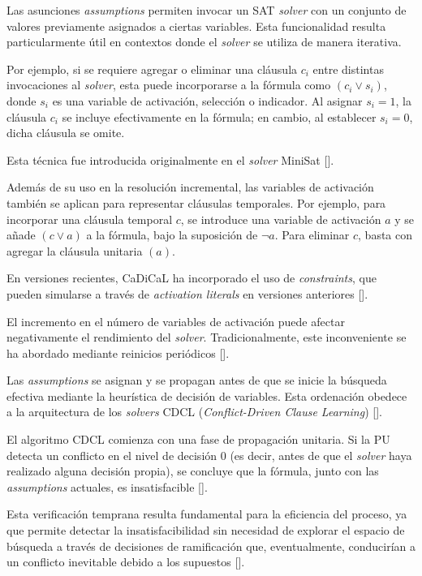 Las asunciones \textit{assumptions} permiten invocar un SAT \textit{solver} con un conjunto de valores previamente asignados a ciertas variables. Esta funcionalidad resulta particularmente útil en contextos donde el \textit{solver} se utiliza de manera iterativa.

Por ejemplo, si se requiere agregar o eliminar una cláusula $c_i$ entre distintas invocaciones al \textit{solver}, esta puede incorporarse a la fórmula como $(c_i \lor s_i)$, donde $s_i$ es una variable de activación, selección o indicador. Al asignar $s_i = 1$, la cláusula $c_i$ se incluye efectivamente en la fórmula; en cambio, al establecer $s_i = 0$, dicha cláusula se omite.

Esta técnica fue introducida originalmente en el \textit{solver} MiniSat [\cite{marques-silva2024cdcl}].

Además de su uso en la resolución incremental, las variables de activación también se aplican para representar cláusulas temporales. Por ejemplo, para incorporar una cláusula temporal $c$, se introduce una variable de activación $a$ y se añade $(c \lor a)$ a la fórmula, bajo la suposición de $\neg a$. Para eliminar $c$, basta con agregar la cláusula unitaria $(a)$.

En versiones recientes, CaDiCaL ha incorporado el uso de \textit{constraints}, que pueden simularse a través de \textit{activation literals} en versiones anteriores [\cite{cadical2024}].

El incremento en el número de variables de activación puede afectar negativamente el rendimiento del \textit{solver}. Tradicionalmente, este inconveniente se ha abordado mediante reinicios periódicos [\cite{su2025deeply_ic3}].


Las \textit{assumptions} se asignan y se propagan antes de que se inicie la búsqueda efectiva mediante la heurística de decisión de variables. Esta ordenación obedece a la arquitectura de los \textit{solvers} CDCL (\textit{Conflict-Driven Clause Learning}) [\cite{marques-silva2024cdcl}].

El algoritmo CDCL comienza con una fase de propagación unitaria. Si la PU detecta un conflicto en el nivel de decisión 0 (es decir, antes de que el \textit{solver} haya realizado alguna decisión propia), se concluye que la fórmula, junto con las \textit{assumptions} actuales, es insatisfacible [\cite{sun2024autosat}].

Esta verificación temprana resulta fundamental para la eficiencia del proceso, ya que permite detectar la insatisfacibilidad sin necesidad de explorar el espacio de búsqueda a través de decisiones de ramificación que, eventualmente, conducirían a un conflicto inevitable debido a los supuestos [\cite{marques-silva2024cdcl}].

